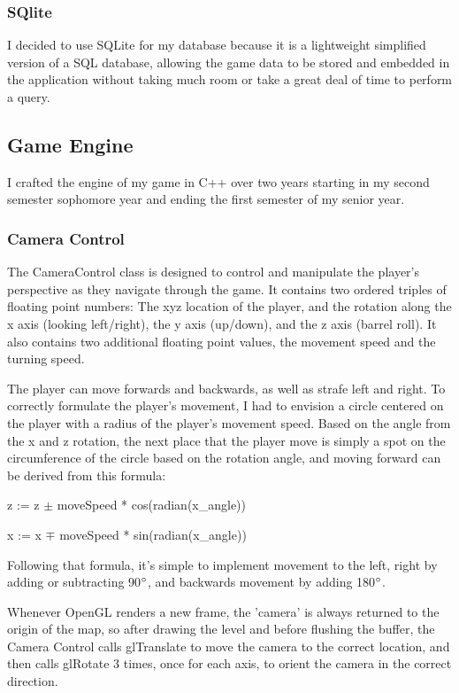 \documentclass{article}
\begin{document}
\subsubsection{SQlite}
I decided to use SQLite for my database because it is a lightweight simplified version of a SQL database, allowing the game data to be stored and embedded in the application without taking much room or take a great deal of time to perform a query.

\subsection{Game Engine}

I crafted the engine of my game in C++ over two years starting in my second semester sophomore year and ending the first semester of my senior year.

\subsubsection{Camera Control}
The CameraControl class is designed to control and manipulate the player's perspective as they navigate through the game. It contains two ordered triples of floating point numbers: The xyz location of the player, and the rotation along the x axis (looking left/right), the y axis (up/down), and the z axis (barrel roll). It also contains two additional floating point values, the movement speed and the turning speed. 

The player can move forwards and backwards, as well as strafe left and right. To correctly formulate the player's movement, I had to envision a circle centered on the player with a radius of the player's movement speed. Based on the angle from the x and z rotation, the next place that the player move is simply a spot on the circumference of the circle based on the rotation angle, and moving forward can be derived from this formula:

z := z $\pm$ moveSpeed * cos(radian(x\_angle))

x := x $\mp$ moveSpeed * sin(radian(x\_angle))

Following that formula, it's simple to implement movement to the left, right by adding or subtracting 90$\degree$, and backwards movement by adding 180$\degree$.

Whenever OpenGL renders a new frame, the 'camera' is always returned to the origin of the map, so after drawing the level and before flushing the buffer, the Camera Control calls glTranslate to move the camera to the correct location, and then calls glRotate 3 times, once for each axis, to orient the camera in the correct direction.
\end{document}
